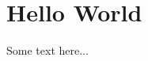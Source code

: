 \documentclass[not-main.tex]{subfiles}
\begin{document}
\chapter{Hello World}
Some text here...
\end{document}
